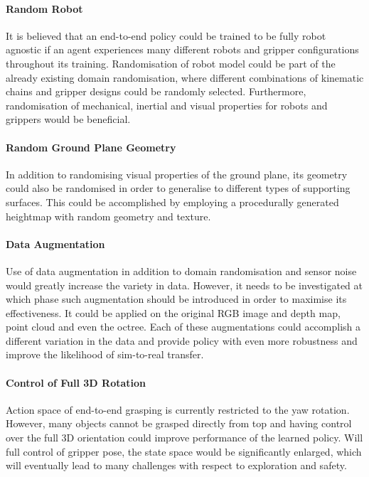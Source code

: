 \paragraph{Random Robot} It is believed that an end-to-end policy could be trained to be fully robot agnostic if an agent experiences many different robots and gripper configurations throughout its training. Randomisation of robot model could be part of the already existing domain randomisation, where different combinations of kinematic chains and gripper designs could be randomly selected. Furthermore, randomisation of mechanical, inertial and visual properties for robots and grippers would be beneficial.

\paragraph{Random Ground Plane Geometry} In addition to randomising visual properties of the ground plane, its geometry could also be randomised in order to generalise to different types of supporting surfaces. This could be accomplished by employing a procedurally generated heightmap with random geometry and texture.

\paragraph{Data Augmentation} Use of data augmentation in addition to domain randomisation and sensor noise would greatly increase the variety in data. However, it needs to be investigated at which phase such augmentation should be introduced in order to maximise its effectiveness. It could be applied on the original RGB image and depth map, point cloud and even the octree. Each of these augmentations could accomplish a different variation in the data and provide policy with even more robustness and improve the likelihood of sim-to-real transfer.

\paragraph{Control of Full 3D Rotation} Action space of end-to-end grasping is currently restricted to the yaw rotation. However, many objects cannot be grasped directly from top and having control over the full 3D orientation could improve performance of the learned policy. Will full control of gripper pose, the state space would be significantly enlarged, which will eventually lead to many challenges with respect to exploration and safety.

